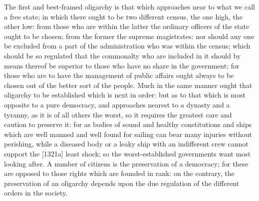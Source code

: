 The first and best-framed oligarchy is that which approaches near to what
we call a free state; in which there ought to be two different census, the
one high, the other low: from those who are within the latter the ordinary
officers of the state ought to be chosen; from the former the supreme
magistrates: nor should any one be excluded from a part of the
administration who was within the census; which should be so regulated
that the commonalty who are included in it should by means thereof be
superior to those who have no share in the government; for those who are
to have the management of public affairs ought always to be chosen out of
the better sort of the people. Much in the same manner ought that
oligarchy to be established which is next in order: but as to that which
is most opposite to a pure democracy, and approaches nearest to a dynasty
and a tyranny, as it is of all others the worst, so it requires the
greatest care and caution to preserve it: for as bodies of sound and
healthy constitutions and ships which are well manned and well found for
sailing can bear many injuries without perishing, while a diseased body or
a leaky ship with an indifferent crew cannot support the [1321a] least
shock; so the worst-established governments want most looking after. A
number of citizens is the preservation of a democracy; for these are
opposed to those rights which are founded in rank: on the contrary, the
preservation of an oligarchy depends upon the due regulation of the
different orders in the society.



